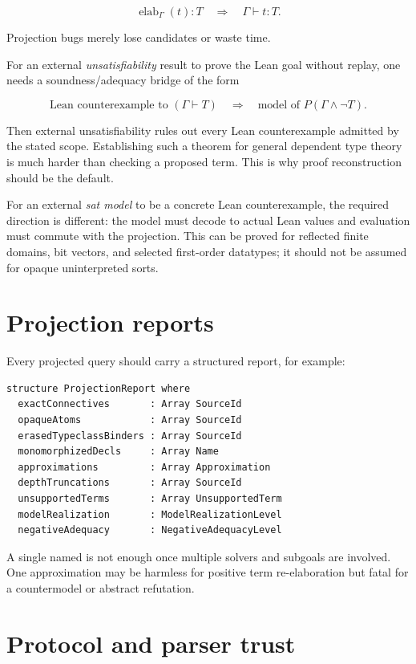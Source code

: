 \documentclass[11pt,letterpaper,openany]{report}
\newcommand{\code}[1]{\texttt{\detokenize{#1}}}
\begin{document}
\[
\operatorname{elab}_{\Gamma}(t) : T
\quad\Longrightarrow\quad
\Gamma \vdash t : T.
\]

Projection bugs merely lose candidates or waste time.

For an external \emph{unsatisfiability} result to prove the Lean goal without replay,
one needs a soundness/adequacy bridge of the form

\[
\text{Lean counterexample to }(\Gamma \vdash T)
\quad\Longrightarrow\quad
\text{model of }P(\Gamma \land \neg T).
\]

Then external unsatisfiability rules out every Lean counterexample admitted by the
stated scope. Establishing such a theorem for general dependent type theory is much
harder than checking a proposed term. This is why proof reconstruction should be the
default.

For an external \emph{sat model} to be a concrete Lean counterexample, the required
direction is different: the model must decode to actual Lean values and evaluation
must commute with the projection. This can be proved for reflected finite domains,
bit vectors, and selected first-order datatypes; it should not be assumed for opaque
uninterpreted sorts.

\section{Projection reports}

Every projected query should carry a structured report, for example:

\begin{lstlisting}[language=LeanFour,caption={Schematic projection report}]
structure ProjectionReport where
  exactConnectives       : Array SourceId
  opaqueAtoms            : Array SourceId
  erasedTypeclassBinders : Array SourceId
  monomorphizedDecls     : Array Name
  approximations         : Array Approximation
  depthTruncations       : Array SourceId
  unsupportedTerms       : Array UnsupportedTerm
  modelRealization       : ModelRealizationLevel
  negativeAdequacy       : NegativeAdequacyLevel
\end{lstlisting}

A single \code{Bool} named \code{complete} is not enough once multiple solvers and
subgoals are involved. One approximation may be harmless for positive term
re-elaboration but fatal for a countermodel or abstract refutation.

\section{Protocol and parser trust}
\end{document}
